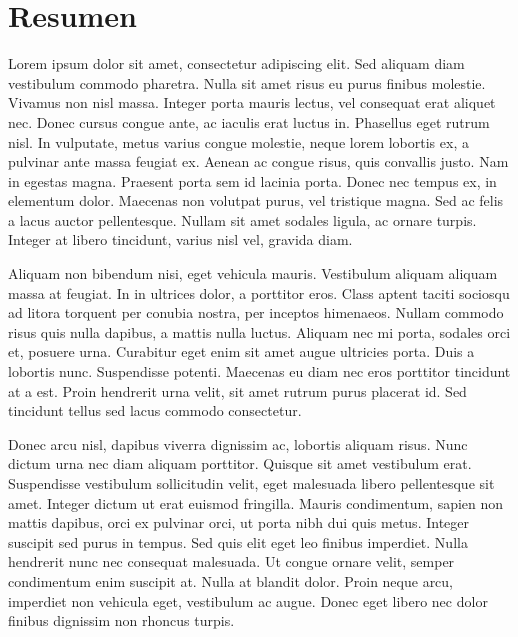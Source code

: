 
\chapter*{Resumen} %

Lorem ipsum dolor sit amet, consectetur adipiscing elit. Sed aliquam diam vestibulum commodo pharetra. Nulla sit amet risus eu purus finibus molestie. Vivamus non nisl massa. Integer porta mauris lectus, vel consequat erat aliquet nec. Donec cursus congue ante, ac iaculis erat luctus in. Phasellus eget rutrum nisl. In vulputate, metus varius congue molestie, neque lorem lobortis ex, a pulvinar ante massa feugiat ex. Aenean ac congue risus, quis convallis justo. Nam in egestas magna. Praesent porta sem id lacinia porta. Donec nec tempus ex, in elementum dolor. Maecenas non volutpat purus, vel tristique magna. Sed ac felis a lacus auctor pellentesque. Nullam sit amet sodales ligula, ac ornare turpis. Integer at libero tincidunt, varius nisl vel, gravida diam.

Aliquam non bibendum nisi, eget vehicula mauris. Vestibulum aliquam aliquam massa at feugiat. In in ultrices dolor, a porttitor eros. Class aptent taciti sociosqu ad litora torquent per conubia nostra, per inceptos himenaeos. Nullam commodo risus quis nulla dapibus, a mattis nulla luctus. Aliquam nec mi porta, sodales orci et, posuere urna. Curabitur eget enim sit amet augue ultricies porta. Duis a lobortis nunc. Suspendisse potenti. Maecenas eu diam nec eros porttitor tincidunt at a est. Proin hendrerit urna velit, sit amet rutrum purus placerat id. Sed tincidunt tellus sed lacus commodo consectetur.

Donec arcu nisl, dapibus viverra dignissim ac, lobortis aliquam risus. Nunc dictum urna nec diam aliquam porttitor. Quisque sit amet vestibulum erat. Suspendisse vestibulum sollicitudin velit, eget malesuada libero pellentesque sit amet. Integer dictum ut erat euismod fringilla. Mauris condimentum, sapien non mattis dapibus, orci ex pulvinar orci, ut porta nibh dui quis metus. Integer suscipit sed purus in tempus. Sed quis elit eget leo finibus imperdiet. Nulla hendrerit nunc nec consequat malesuada. Ut congue ornare velit, semper condimentum enim suscipit at. Nulla at blandit dolor. Proin neque arcu, imperdiet non vehicula eget, vestibulum ac augue. Donec eget libero nec dolor finibus dignissim non rhoncus turpis.

